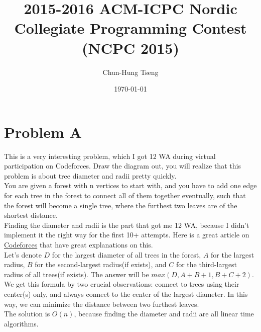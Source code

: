 \documentclass[10pt]{article}
\title{2015-2016 ACM-ICPC Nordic Collegiate Programming Contest (NCPC 2015)} %
\author{Chun-Hung Tseng}
\date{\today}
\begin{document}
 

\begin{titlepage}
\maketitle
\end{titlepage}




\section*{Problem A}

This is a very interesting problem, which I got 12 WA during virtual participation on Codeforces. Draw the diagram out, you will realize that this problem is about tree diameter and radii pretty quickly. \\

You are given a forest with n vertices to start with, and you have to add one edge for each tree in the forest to connect all of them together eventually, such that the forest will become a single tree, where the furthest two leaves are of the shortest distance.\\ 

Finding the diameter and radii is the part that got me 12 WA, because I didn't implement it the right way for the first 10+ attempts. Here is a great article on \href{http://codeforces.com/blog/entry/17974}{Codeforces} that have great explanations on this. \\

Let's denote $D$ for the largest diameter of all trees in the forest, $A$ for the largest radius, $B$ for the second-largest radius(if exists), and $C$ for the third-largest radius of all trees(if exists). The answer will be $max(D, A+B+1, B+C+2)$. We get this formula by two crucial observations: connect to trees using their center(s) only, and always connect to the center of the largest diameter. In this way, we can minimize the distance between two furthest leaves.\\

The solution is $O(n)$, because finding the diameter and radii are all linear time algorithms.
\end{document}

